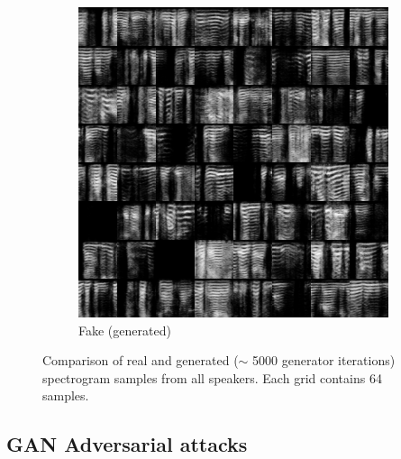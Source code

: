 \begin{figure}[h]
\begin{subfigure}[b]{0.4\textwidth}
        \includegraphics[width=\textwidth]{./fig/samples_5419.png}
        \caption{Fake (generated)}
        \label{fig:samples_fake}
    \end{subfigure}
    \caption{Comparison of real and generated ($\sim$ 5000 generator iterations)
    spectrogram samples from all speakers. Each grid contains 64 samples.}
    \label{fig:samples_comparison}
\end{figure}

\subsection{GAN Adversarial attacks}

